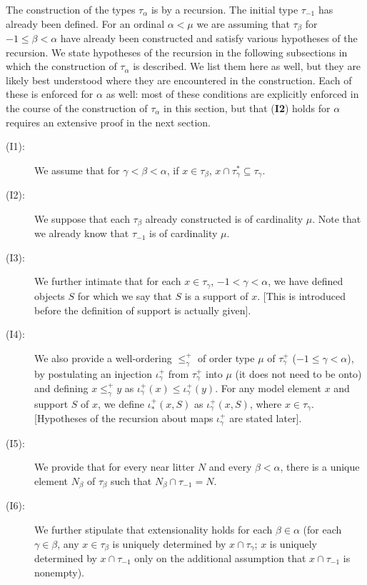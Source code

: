 \documentclass[112pt]{article}
\begin{document}
The construction of the types $\tau_\alpha$ is by a recursion.  The initial type $\tau_{-1}$ has already been defined.  For an ordinal $\alpha<\mu$ we are assuming that $\tau_\beta$ for $-1\leq \beta<\alpha$ have already been constructed and satisfy various hypotheses of the recursion.  We state hypotheses of the recursion in the following subsections in which the construction of $\tau_\alpha$ is described.  We list them here as well, but they are likely best understood where they are encountered in the construction.  Each of these is enforced for $\alpha$ as well:  most of these conditions are explicitly enforced in the course of the construction of $\tau_\alpha$ in this section, but that ({\bf I2}) holds for $\alpha$ requires an extensive proof in the next section.

\begin{description}

\item[(I1):]  We assume that for $\gamma<\beta<\alpha$, if $x \in \tau_\beta$, $x \cap \tau^*_\gamma \subseteq \tau_\gamma$.

\item[(I2):]  We suppose that each $\tau_\beta$ already constructed is of cardinality $\mu$.  Note that we already know that
$\tau_{-1}$ is of cardinality $\mu$.

\item[(I3):]  We further intimate that for each $x \in \tau_\gamma$, $-1<\gamma<\alpha$, we have defined objects $S$ for which we say that $S$ is a support of $x$.  [This is introduced before the definition of support is actually given].

\item[(I4):]  We also provide a well-ordering $\leq^+_\gamma$ of order type $\mu$ of $\tau_\gamma^+$ ($-1 \leq \gamma <\alpha$), by postulating an injection $\iota^+_\gamma$ from $\tau_\gamma^+$ into $\mu$ (it does not need to be onto) and defining $x \leq^+_\gamma y$ as $\iota^+_\gamma(x) \leq \iota^+_\gamma(y)$.    For any model element $x$ and support $S$ of $x$, we define $\iota^+_*(x,S)$ as $\iota^+_\gamma(x,S)$, where $x \in \tau_\gamma$.    [Hypotheses of the recursion about maps $\iota^+_\gamma$ are stated later].

\item[(I5):]  We provide that for every near litter $N$ and every $\beta<\alpha$, there is a unique element $N_\beta$ of $\tau_\beta$ such that $N_\beta \cap \tau_{-1}=N$.

\item[(I6):]  We further stipulate that extensionality holds for each $\beta\in \alpha$ (for each $\gamma\in \beta$, any $x \in \tau_\beta$ is uniquely determined by $x \cap \tau_\gamma$;  $x$ is uniquely determined by $x \cap \tau_{-1}$ only on the additional assumption that $x \cap \tau_{-1}$ is nonempty).


\end{description}
\end{document}
